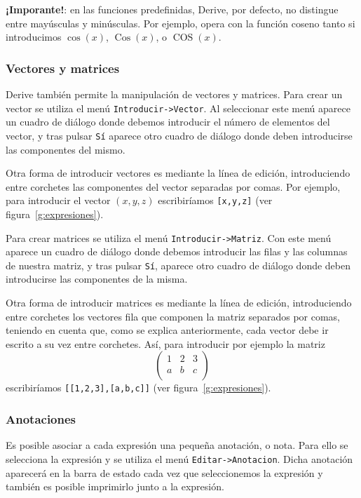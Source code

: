 \textbf{¡Imporante!}: en las funciones predefinidas, Derive, por
defecto, no distingue entre mayúsculas y minúsculas. Por ejemplo,
opera con la función coseno tanto si introducimos $\cos(x)$,
$\operatorname {Cos}(x)$, o $\operatorname {COS}(x)$.

\subsubsection*{Vectores y matrices}
Derive también permite la manipulación de vectores y matrices. Para
crear un vector se utiliza el menú \texttt{Introducir->Vector}. Al
seleccionar este menú aparece un cuadro de diálogo donde debemos
introducir el número de elementos del vector, y tras pulsar
\texttt{Sí} aparece otro cuadro de diálogo donde deben introducirse
las componentes del mismo.

Otra forma de introducir vectores es mediante la línea de edición,
introduciendo entre corchetes las componentes del vector separadas
por comas. Por ejemplo, para introducir el vector $(x,y,z)$
escribiríamos \texttt{[x,y,z]} (ver figura~\ref{g:expresiones}).

Para crear matrices se utiliza el menú \texttt{Introducir->Matriz}.
Con este menú aparece un cuadro de diálogo donde debemos introducir
las filas y las columnas de nuestra matriz, y tras pulsar
\texttt{Sí}, aparece otro cuadro de diálogo donde deben introducirse
las componentes de la misma.

Otra forma de introducir matrices es mediante la línea de edición,
introduciendo entre corchetes los vectores fila que componen la
matriz separados por comas, teniendo en cuenta que, como se explica
anteriormente, cada vector debe ir escrito a su vez entre corchetes.
Así, para introducir por ejemplo la matriz
\[
\left(
\begin{array}{ccc}
 1 & 2 & 3 \\
 a & b & c \\
\end{array}
\right)
\]
escribiríamos \texttt{[[1,2,3],[a,b,c]]} (ver
figura~\ref{g:expresiones}).

\subsubsection*{Anotaciones}
Es posible asociar a cada expresión una pequeña anotación, o nota.
Para ello se selecciona la expresión y se utiliza el menú
\texttt{Editar->Anotacion}. Dicha anotación aparecerá en la barra de
estado cada vez que seleccionemos la expresión y también es posible
imprimirlo junto a la expresión.

